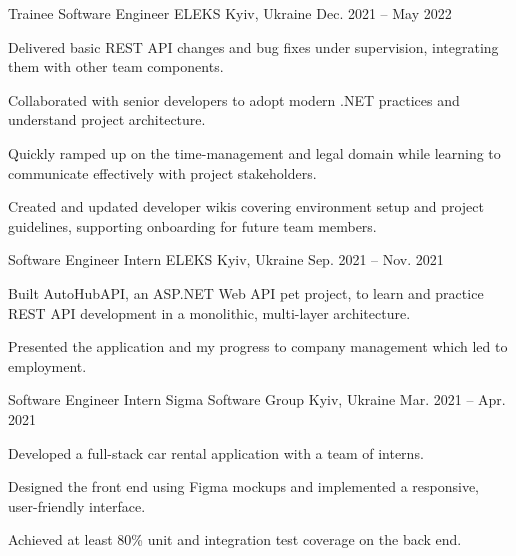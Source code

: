 \begin{cventries}
  \cventry
    {Trainee Software Engineer} %
    {ELEKS} %
    {Kyiv, Ukraine} %
    {Dec. 2021 – May 2022} %
    {
      \begin{cvitems} %
        \item {Delivered basic REST API changes and bug fixes under supervision, integrating them with other team components.}
        \item {Collaborated with senior developers to adopt modern .NET practices and understand project architecture.}
        \item {Quickly ramped up on the time-management and legal domain while learning to communicate effectively with project stakeholders.}        \item {Created and updated developer wikis covering environment setup and project guidelines, supporting onboarding for future team members.}
      \end{cvitems}
    }

  \cventry
    {Software Engineer Intern} %
    {ELEKS} %
    {Kyiv, Ukraine} %
    {Sep. 2021 – Nov. 2021} %
    {
      \begin{cvitems} %
        \item {Built AutoHubAPI, an ASP.NET Web API pet project, to learn and practice REST API development in a monolithic, multi-layer architecture.}
        \item {Presented the application and my progress to company management which led to employment.}
      \end{cvitems}
    }

  \cventry
    {Software Engineer Intern} %
    {Sigma Software Group} %
    {Kyiv, Ukraine} %
    {Mar. 2021 – Apr. 2021} %
    {
      \begin{cvitems} %
        \item {Developed a full-stack car rental application with a team of interns.}
        \item {Designed the front end using Figma mockups and implemented a responsive, user-friendly interface.}
        \item {Achieved at least 80\% unit and integration test coverage on the back end.}
      \end{cvitems}
    }
\end{cventries}
